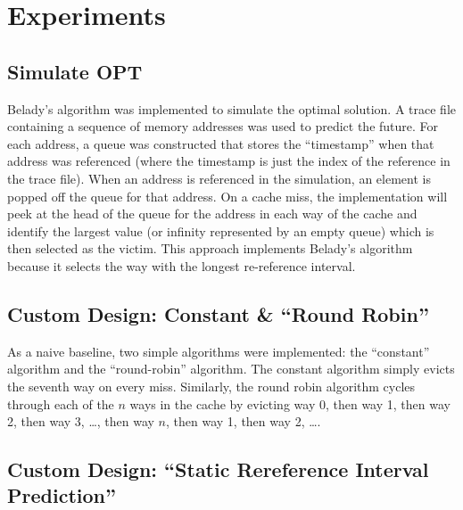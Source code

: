 \documentclass[9pt]{article}
\begin{document}
\maketitle

\section{Experiments}

	\subsection{Simulate OPT}

		Belady's algorithm was implemented to simulate the optimal solution. A trace file containing a sequence of memory addresses was used to predict the future. For each address, a queue was constructed that stores the ``timestamp'' when that address was referenced (where the timestamp is just the index of the reference in the trace file). When an address is referenced in the simulation, an element is popped off the queue for that address. On a cache miss, the implementation will peek at the head of the queue for the address in each way of the cache and identify the largest value (or infinity represented by an empty queue) which is then selected as the victim. This approach implements Belady's algorithm because it selects the way with the longest re-reference interval. 

	\subsection{Custom Design: Constant \& ``Round Robin''}

		As a naive baseline, two simple algorithms were implemented: the ``constant'' algorithm and the ``round-robin'' algorithm. The constant algorithm simply evicts the seventh way on every miss. Similarly, the round robin algorithm cycles through each of the $n$ ways in the cache by evicting way 0, then way 1, then way 2, then way 3, \ldots, then way $n$, then way 1, then way 2, \ldots.

	\subsection{Custom Design: ``Static Rereference Interval Prediction''}
\end{document}
